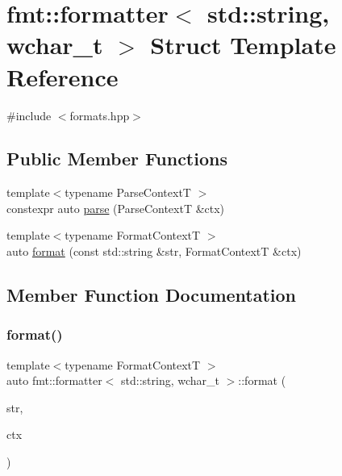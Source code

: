 \hypertarget{structfmt_1_1formatter_3_01std_1_1string_00_01wchar__t_01_4}{}\section{fmt\+:\+:formatter$<$ std\+:\+:string, wchar\+\_\+t $>$ Struct Template Reference}
\label{structfmt_1_1formatter_3_01std_1_1string_00_01wchar__t_01_4}


{\ttfamily \#include $<$formats.\+hpp$>$}

\subsection*{Public Member Functions}
\begin{DoxyCompactItemize}
\item 
{\footnotesize template$<$typename Parse\+ContextT $>$ }\\constexpr auto \mbox{\hyperlink{structfmt_1_1formatter_3_01std_1_1string_00_01wchar__t_01_4_a08e9854fbe74bf6dacdc465cb2b062c3}{parse}} (Parse\+ContextT \&ctx)
\item 
{\footnotesize template$<$typename Format\+ContextT $>$ }\\auto \mbox{\hyperlink{structfmt_1_1formatter_3_01std_1_1string_00_01wchar__t_01_4_a9814f539c9f55bdb9a54bf7f4387a8bb}{format}} (const std\+::string \&str, Format\+ContextT \&ctx)
\end{DoxyCompactItemize}


\subsection{Member Function Documentation}
\mbox{\label{structfmt_1_1formatter_3_01std_1_1string_00_01wchar__t_01_4_a9814f539c9f55bdb9a54bf7f4387a8bb}} 
\subsubsection{\texorpdfstring{format()}{format()}}
{\footnotesize\ttfamily template$<$typename Format\+ContextT $>$ \\
auto fmt\+::formatter$<$ std\+::string, wchar\+\_\+t $>$\+::format (\begin{DoxyParamCaption}\item[{const std\+::string \&}]{str,  }\item[{Format\+ContextT \&}]{ctx }\end{DoxyParamCaption})}

